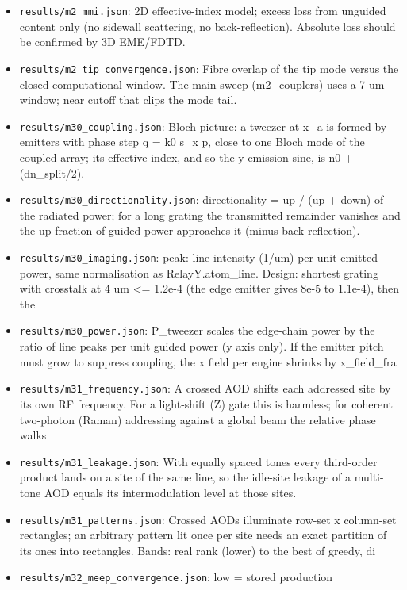 \begin{itemize}
\item
  \texttt{results/m2\_mmi.json}: 2D effective-index model; excess loss
  from unguided content only (no sidewall scattering, no
  back-reflection). Absolute loss should be confirmed by 3D EME/FDTD.
\item
  \texttt{results/m2\_tip\_convergence.json}: Fibre overlap of the tip
  mode versus the closed computational window. The main sweep
  (m2\_couplers) uses a 7 um window; near cutoff that clips the mode
  tail.
\item
  \texttt{results/m30\_coupling.json}: Bloch picture: a tweezer at x\_a
  is formed by emitters with phase step q = k0 s\_x p, close to one
  Bloch mode of the coupled array; its effective index, and so the y
  emission sine, is n0 + (dn\_split/2).
\item
  \texttt{results/m30\_directionality.json}: directionality = up / (up +
  down) of the radiated power; for a long grating the transmitted
  remainder vanishes and the up-fraction of guided power approaches it
  (minus back-reflection).
\item
  \texttt{results/m30\_imaging.json}: peak: line intensity (1/um) per
  unit emitted power, same normalisation as RelayY.atom\_line. Design:
  shortest grating with crosstalk at 4 um \textless= 1.2e-4 (the edge
  emitter gives 8e-5 to 1.1e-4), then the
\item
  \texttt{results/m30\_power.json}: P\_tweezer scales the edge-chain
  power by the ratio of line peaks per unit guided power (y axis only).
  If the emitter pitch must grow to suppress coupling, the x field per
  engine shrinks by x\_field\_fra
\item
  \texttt{results/m31\_frequency.json}: A crossed AOD shifts each
  addressed site by its own RF frequency. For a light-shift (Z) gate
  this is harmless; for coherent two-photon (Raman) addressing against a
  global beam the relative phase walks
\item
  \texttt{results/m31\_leakage.json}: With equally spaced tones every
  third-order product lands on a site of the same line, so the idle-site
  leakage of a multi-tone AOD equals its intermodulation level at those
  sites.
\item
  \texttt{results/m31\_patterns.json}: Crossed AODs illuminate row-set x
  column-set rectangles; an arbitrary pattern lit once per site needs an
  exact partition of its ones into rectangles. Bands: real rank (lower)
  to the best of greedy, di
\item
  \texttt{results/m32\_meep\_convergence.json}: low = stored production

\end{itemize}
